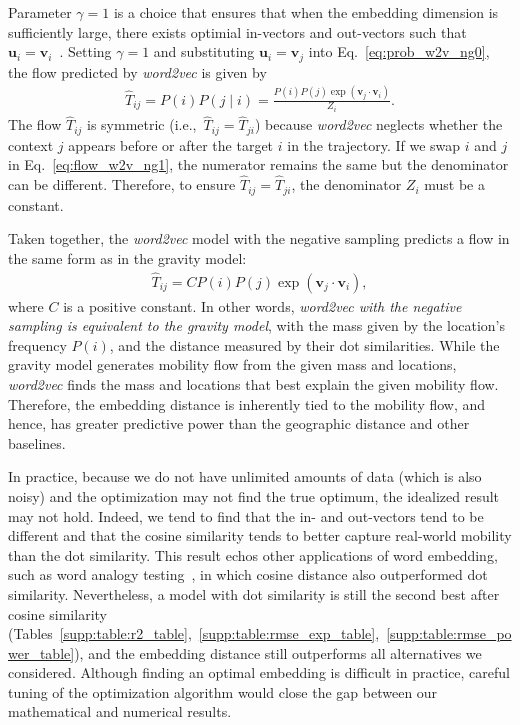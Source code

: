 \documentclass[12pt]{article} %
\def\given{\mid}
\def\ie{i.e.,~}
\begin{document}
Parameter $\gamma=1$ is a choice that ensures that when the embedding dimension is sufficiently large, there exists optimial in-vectors and out-vectors such that $\bm{u}_i = \bm{v}_i$~\autocite{levy2014neural}.
Setting $\gamma = 1$ and substituting $\bm{u}_i = \bm{v}_j$ into Eq.~\eqref{eq:prob_w2v_ng0}, the flow predicted by {\it word2vec} is given by
\begin{align}
	\hat{T}_{ij}= P(i) P(j\given i) = \frac{P(i)P(j)\exp(\bm{v}_j \cdot \bm{v}_{i})}{Z_i}. \label{eq:flow_w2v_ng1}
\end{align}
The flow $\hat{T}_{ij}$ is symmetric (\ie $\hat{T}_{ij}=\hat{T}_{ji}$) because {\it word2vec} neglects whether the context $j$ appears before or after the target $i$ in the trajectory.
If we swap $i$ and $j$ in Eq.~\eqref{eq:flow_w2v_ng1}, the numerator remains the same but the denominator can be different.
Therefore, to ensure $\hat{T}_{ij} = \hat{T}_{ji}$, the denominator $Z_i$ must be a constant.

Taken together, the {\it word2vec} model with the negative sampling predicts a flow in the same form as in the gravity model:
\begin{align}
	\hat{T}_{ij}=  C P(i) P(j)  \exp(\bm{v}_j \cdot \bm{v}_{i}), \label{eq:flow_w2v_ng0}
\end{align}
where $C$ is a positive constant.
In other words, \emph{word2vec with the negative sampling is equivalent to the gravity model}, with the mass given by the location's frequency $P(i)$, and the distance measured by their dot similarities.
While the gravity model generates mobility flow from the given mass and locations, {\it word2vec} finds the mass and locations that best explain the given mobility flow.
Therefore, the embedding distance is inherently tied to the mobility flow, and hence, has greater predictive power than the geographic distance and other baselines.

In practice, because we do not have unlimited amounts of data (which is also noisy) and the optimization may not find the true optimum, the idealized result may not hold. 
Indeed, we tend to find that the in- and out-vectors tend to be different and that the cosine similarity tends to better capture real-world mobility than the dot similarity.
This result echos other applications of word embedding, such as word analogy testing~\autocite{levy2015improving}, in which cosine distance also outperformed dot similarity.
Nevertheless, a model with dot similarity is still the second best after cosine similarity (Tables~\ref{supp:table:r2_table},~\ref{supp:table:rmse_exp_table},~\ref{supp:table:rmse_power_table}), and the embedding distance still outperforms all alternatives we considered. 
Although finding an optimal embedding is difficult in practice, careful tuning of the optimization algorithm would close the gap between our mathematical and numerical results.
\end{document}
